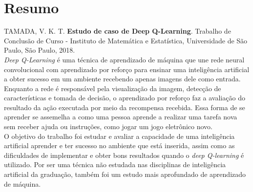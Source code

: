 \chapter*{Resumo}
%
\noindent%
TAMADA, V. K. T. \textbf{Estudo de caso de Deep Q-Learning}. Trabalho de Conclusão de Curso
 - Instituto de Matemática e Estatística, Universidade de São Paulo,
São Paulo, 2018.
\\

\textit{Deep Q-Learning} é uma técnica de aprendizado de máquina que une rede neural convolucional com aprendizado por reforço para ensinar uma inteligência artificial a obter sucesso em um ambiente recebendo apenas imagens dele como entrada.
Enquanto a rede é responsável pela visualização da imagem, detecção de características e tomada de decisão, o aprendizado por reforço faz a avaliação do resultado da ação executada por meio da recompensa recebida.
Essa forma de se aprender se assemelha a como uma pessoa aprende a realizar uma tarefa nova sem receber ajuda ou instruções, como jogar um jogo eletrônico novo.
\\

O objetivo do trabalho foi estudar e avaliar a capacidade de uma inteligência artificial aprender e ter sucesso no ambiente que está inserida, assim como as dificuldades de implementar e obter bons resultados quando o \textit{deep Q-learning} é utilizado.
Por ser uma técnica não estudada nas disciplinas de inteligência artificial da graduação, também foi um estudo mais aprofundado de aprendizado de máquina.
\\


